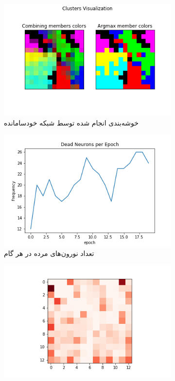 \documentclass[12pt, a4paper]{article}
\begin{document}
\clearpage

\begin{figure}[h]
    \begin{subfigure}{\linewidth}
        \centering
        \includegraphics[width=0.8\linewidth]{images/q5/r15/cluster.png}
        \caption{خوشه‌بندی انجام شده توسط شبکه خودسامانده}
    \end{subfigure}
    \newline
    \begin{subfigure}{0.45\linewidth}
        \includegraphics[width=\linewidth]{images/q5/r15/dead.png}
        \caption{تعداد نورون‌های مرده در هر گام}
    \end{subfigure}
    \hfill
    \begin{subfigure}{0.45\linewidth}
        \includegraphics[width=\linewidth]{images/q5/r15/umatrix.png}

\end{subfigure}
\end{figure}
\end{document}

